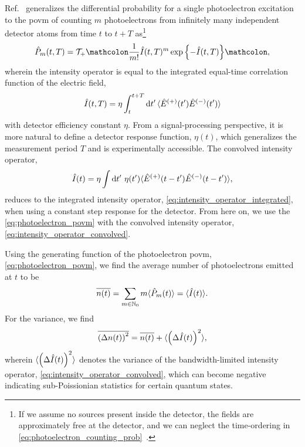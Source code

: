 Ref.~\cite[p.~725]{Mandel1995} generalizes the differential probability for a single photoelectron excitation to the \gls{povm} of counting $m$ photoelectrons from infinitely many independent detector atoms from time $t$ to $t+T$ as\footnote{If we assume no sources present inside the detector, the fields are approximately free at the detector, and we can neglect the time-ordering in \cref{eq:photoelectron_counting_prob}~\cite[p.~183]{Vogel2006}.}
\begin{equation}
	\hat{P}_m(t,T)
	=
	\mathcal{T}_+
	\norder{
		\frac{1}{m!}
		\hat{I}(t,T)^m
		\exp\left\{
			-\hat{I}(t,T)
		\right\}
	}
	\label{eq:photoelectron_povm}
	,	
\end{equation}
wherein the intensity operator is equal to the integrated equal-time correlation function of the electric field, 
\begin{align}
	\hat{I}(t,T)
	=
	\eta
	\int_t^{t+T}\dd{t^\prime}
	\expval{
		\hat{E}^{(+)}(t^\prime)
		\hat{E}^{(-)}(t^\prime)
	}
	\label{eq:intensity_operator_integrated}
\end{align}
with detector efficiency constant $\eta$.
From a signal-processing perspective, it is more natural to define a detector response function, $\eta(t)$, which generalizes the measurement period $T$ and is experimentally accessible.
The convolved intensity operator,
\begin{align}
	\hat{I}(t)
	=
	\eta
	\int\dd{t^\prime}
	\eta(t^\prime)
	\expval{
		\hat{E}^{(+)}(t-t^\prime)
		\hat{E}^{(-)}(t-t^\prime)
	}
	\label{eq:intensity_operator_convolved}
	,
\end{align}
reduces to the integrated intensity operator, \cref{eq:intensity_operator_integrated}, when using a constant step response for the detector.
From here on, we use the \cref{eq:photoelectron_povm} with the convolved intensity operator, \cref{eq:intensity_operator_convolved}.

Using the generating function of the photoelectron \gls{povm}, \cref{eq:photoelectron_povm}, we find the average number of photoelectrons emitted at $t$ to be~\cite[p.~183]{Vogel2006}
\begin{equation}
	\overline{n(t)}
	=
	\sum_{m\in\mathbb{N}_0}
	m
	\langle\hat{P}_m(t)\rangle
	=
	\langle\hat{I}(t)\rangle
	\label{eq:photoelectron_povm_mean}
	.
\end{equation}
For the variance, we find~\cite[p.~736]{Mandel1995}
\begin{equation}
	\overline{\left(\Delta n(t)\right)^2}
	=
	\overline{n(t)}
	+
	\langle\left(\Delta\hat{I}(t)\right)^2\rangle
	\label{eq:photoelectron_povm_var}
	,
\end{equation}
wherein $\langle\left(\Delta\hat{I}(t)\right)^2\rangle$ denotes the variance of the bandwidth-limited intensity operator, \cref{eq:intensity_operator_convolved}, which can become negative indicating sub-Poissionian statistics for certain quantum states.

